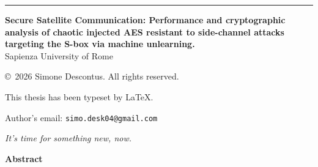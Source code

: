 \documentclass[11pt,a4paper]{report}
\begin{document}
{\newpage

\setlength{\parindent}{0pt}

\thispagestyle{empty} 

\vspace*{\fill}

\rule{\textwidth}{0.4pt}

\vspace{0.3cm}

{\textbf{Secure Satellite Communication: Performance and cryptographic analysis of chaotic injected AES resistant to side-channel attacks targeting the S-box via machine unlearning.}} \\
Sapienza University of Rome

\vspace{0.4cm}

\copyright\ 2026 Simone Descontus. All rights reserved.

\vspace{0.4cm}

This thesis has been typeset by \LaTeX.

\vspace{0.4cm}

Author's email: \texttt{simo.desk04@gmail.com}

\vspace{1cm} %
}

\cleardoublepage
\thispagestyle{empty}

\vspace*{0.28\textheight}
\begin{flushright}
    \begin{minipage}{0.70\textwidth}
        \raggedleft
        \textit{It's time for something new, now.}\\
    \end{minipage}
\end{flushright}
\cleardoublepage



\cleardoublepage
\thispagestyle{myheadings}
\markright{}
\vspace*{1.2cm}
{\noindent\Large\bfseries Abstract\par}
\vspace{0.4cm}
\end{document}
